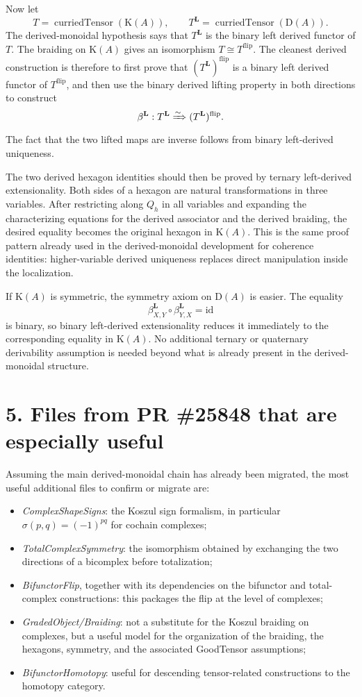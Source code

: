\documentclass[10pt,a4paper]{article}
\newcommand{\K}{\mathrm K(A)}
\newcommand{\D}{\mathrm D(A)}
\begin{document}
Now let
\[
  T=\operatorname{curriedTensor}(\K),
  \qquad
  T^{\mathbf L}=\operatorname{curriedTensor}(\D).
\]
The derived-monoidal hypothesis says that $T^{\mathbf L}$ is the binary left derived functor of $T$. The braiding on $\K$ gives an isomorphism $T\cong T^{\mathrm{flip}}$. The cleanest derived construction is therefore to first prove that $(T^{\mathbf L})^{\mathrm{flip}}$ is a binary left derived functor of $T^{\mathrm{flip}}$, and then use the binary derived lifting property in both directions to construct
\[
  \beta^{\mathbf L}:T^{\mathbf L}\xRightarrow{\sim}(T^{\mathbf L})^{\mathrm{flip}}.
\]
The fact that the two lifted maps are inverse follows from binary left-derived uniqueness.

The two derived hexagon identities should then be proved by ternary left-derived extensionality. Both sides of a hexagon are natural transformations in three variables. After restricting along $Q_h$ in all variables and expanding the characterizing equations for the derived associator and the derived braiding, the desired equality becomes the original hexagon in $\K$. This is the same proof pattern already used in the derived-monoidal development for coherence identities: higher-variable derived uniqueness replaces direct manipulation inside the localization.

If $\K$ is symmetric, the symmetry axiom on $\D$ is easier. The equality
\[
  \beta^{\mathbf L}_{X,Y}\circ\beta^{\mathbf L}_{Y,X}=\mathrm{id}
\]
is binary, so binary left-derived extensionality reduces it immediately to the corresponding equality in $\K$. No additional ternary or quaternary derivability assumption is needed beyond what is already present in the derived-monoidal structure.

\section*{5. Files from PR \#25848 that are especially useful}

Assuming the main derived-monoidal chain has already been migrated, the most useful additional files to confirm or migrate are:
\begin{itemize}
  \item \emph{ComplexShapeSigns}: the Koszul sign formalism, in particular $\sigma(p,q)=(-1)^{pq}$ for cochain complexes;
  \item \emph{TotalComplexSymmetry}: the isomorphism obtained by exchanging the two directions of a bicomplex before totalization;
  \item \emph{BifunctorFlip}, together with its dependencies on the bifunctor and total-complex constructions: this packages the flip at the level of complexes;
  \item \emph{GradedObject/Braiding}: not a substitute for the Koszul braiding on complexes, but a useful model for the organization of the braiding, the hexagons, symmetry, and the associated GoodTensor assumptions;
  \item \emph{BifunctorHomotopy}: useful for descending tensor-related constructions to the homotopy category.
\end{itemize}
\end{document}
